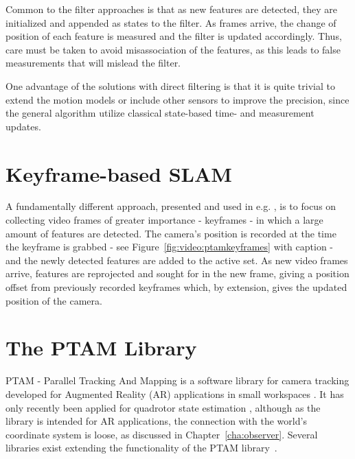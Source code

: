        Common to the filter approaches is that as new features are detected,
        they are initialized and appended as states to the filter.
        As frames arrive, the change of position of each feature is measured and
        the filter is updated accordingly.
        Thus, care must be taken to avoid misassociation of the features, as
        this leads to false measurements that will mislead the filter.

        One advantage of the solutions with direct filtering is that it is quite
        trivial to extend the motion models or include other sensors to improve the precision, since
        the general algorithm utilize classical state-based time- and measurement updates.

    \section{Keyframe-based SLAM}
    \label{sec:video:kfslam}
        A fundamentally different approach, presented and used in e.g. \citep{klein07parallel},
        is to focus on collecting video frames of greater importance - keyframes -
        in which a large amount of features are detected.
        The camera's position is recorded at the time the keyframe is grabbed - see Figure~\ref{fig:video:ptamkeyframes} with caption -
        and the newly detected features are added to the active set.
        As new video frames arrive, features are reprojected and sought for in
        the new frame, giving a position offset from previously recorded keyframes which, by
        extension, gives the updated position of the camera.


\pagebreak
    \section{The PTAM Library}
        PTAM - Parallel Tracking And Mapping is a software library for camera tracking
        developed for Augmented Reality (AR) applications in small workspaces \citep{klein07parallel}.
        It has only recently been applied for quadrotor state estimation \citep{weiss11monocular},
        although as the library is intended for AR applications, the connection
        with the world's coordinate system is loose, as discussed in Chapter~\ref{cha:observer}.
        Several libraries exist extending the functionality of the PTAM library~\citep{Nguyen_Sandor_Park_2010}.

